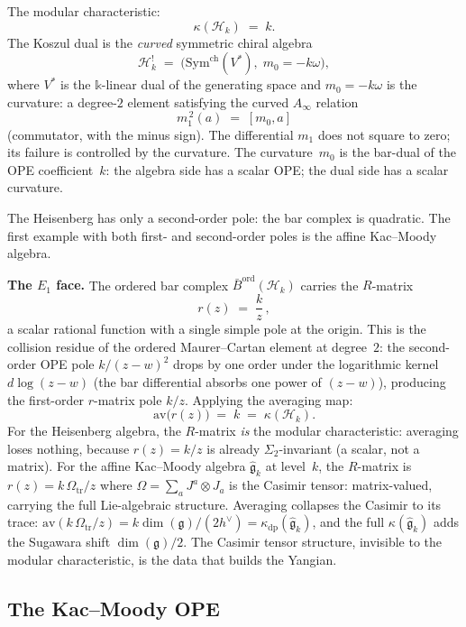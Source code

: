 \documentclass[11pt]{report}
\theoremstyle{definition}
\theoremstyle{remark}
\providecommand{\barB}{\bar{B}}
\providecommand{\Bbbk}{\mathbb{k}}
\numberwithin{equation}{section}
\begin{document}
The modular characteristic:
\[
\kappa(\mathcal H_k)\;=\;k.
\]
The Koszul dual is the \emph{curved} symmetric chiral algebra
\[
\mathcal H_k^!
\;=\;
\bigl(\mathrm{Sym}^{\mathrm{ch}}(V^*),\;m_0=-k\omega\bigr),
\]
where $V^*$ is the $\Bbbk$-linear dual of the generating space and
$m_0=-k\omega$ is the curvature: a degree-$2$ element satisfying
the curved $A_\infty$ relation
\[
m_1^{\,2}(a)\;=\;[m_0,a]
\]
(commutator, with the minus sign). The differential $m_1$ does not
square to zero; its failure is controlled by the curvature. The
curvature~$m_0$ is the bar-dual of the OPE coefficient~$k$:
the algebra side has a scalar OPE; the dual side has a scalar
curvature.

The Heisenberg has only a second-order pole: the bar complex is
quadratic. The first example with both first- and second-order
poles is the affine Kac--Moody algebra.

\medskip
\noindent\textbf{The $E_1$ face.}\enspace
The ordered bar complex $\barB^{\mathrm{ord}}(\mathcal H_k)$ carries
the $R$-matrix
\[
r(z) \;=\; \frac{k}{z}\,,
\]
a scalar rational function with a single simple pole at the origin.
This is the collision residue of the ordered Maurer--Cartan element at
degree~$2$: the second-order OPE pole $k/(z-w)^2$ drops by one order
under the logarithmic kernel $d\log(z-w)$ (the bar differential
absorbs one power of $(z-w)$), producing the first-order $r$-matrix
pole $k/z$. Applying the averaging map:
\[
\mathrm{av}\bigl(r(z)\bigr) \;=\; k \;=\; \kappa(\mathcal H_k).
\]
For the Heisenberg algebra, the $R$-matrix \emph{is} the modular
characteristic: averaging loses nothing, because $r(z) = k/z$ is
already $\Sigma_2$-invariant (a scalar, not a matrix). For the
affine Kac--Moody algebra $\widehat{\mathfrak g}_k$ at level~$k$, the
$R$-matrix is $r(z) = k\,\Omega_{\mathrm{tr}}/z$ where
$\Omega = \sum_a J^a \otimes J_a$ is the Casimir tensor:
matrix-valued, carrying the full Lie-algebraic structure. Averaging
collapses the Casimir to its trace:
$\mathrm{av}(k\,\Omega_{\mathrm{tr}}/z) = k\dim(\mathfrak g)/(2h^\vee)
= \kappa_{\mathrm{dp}}(\widehat{\mathfrak g}_k)$, and the full
$\kappa(\widehat{\mathfrak g}_k)$ adds the Sugawara shift
$\dim(\mathfrak g)/2$. The Casimir tensor structure,
invisible to the modular characteristic, is the data that builds the
Yangian.

\subsection*{The Kac--Moody OPE}
\end{document}
